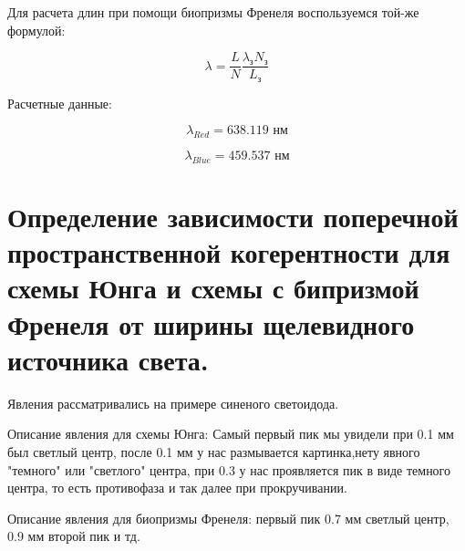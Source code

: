 \documentclass[12pt, a4paper]{report}
\begin{document}
Для расчета длин при помощи биопризмы Френеля воспользуемся той-же формулой: 

\[ \lambda = \frac{L }{N} \frac{\lambda _{\text{з} }N_{\text{з} }  } {L _{\text{з} }}\] 

Расчетные данные: 

\[ \lambda_{Red} = 638.119 \text{ нм}  \] 

\[ \lambda_{Blue} = 459.537\text{ нм}  \] 

\section{Определение зависимости поперечной пространственной когерентности для схемы Юнга и схемы с бипризмой Френеля
от ширины щелевидного источника света.}

Явления рассматривались на примере синеного светоидода.

Описание явления для схемы Юнга: Самый первый пик мы увидели при 0.1 мм был светлый центр, после 0.1 мм у нас размывается картинка,нету явного "темного" или "светлого" центра, при 0.3 у нас проявляется пик в виде темного центра, то есть противофаза и так далее при прокручивании.

Описание явления для биопризмы Френеля: первый пик 0.7 мм светлый центр, 0.9 мм второй пик и тд.
\end{document}
